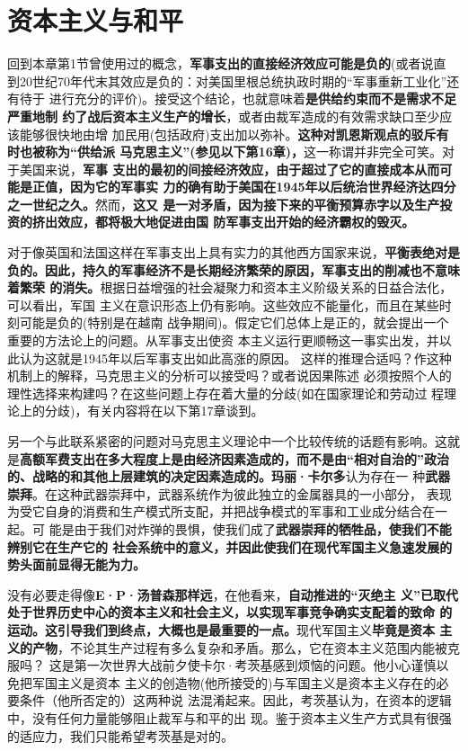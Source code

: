\section{资本主义与和平}
回到本章第1节曾使用过的概念，\textbf{军事支出的直接经济效应可能是负的}(或者说直
到20世纪70年代末其效应是负的：对美国里根总统执政时期的“军事重新工业化”还有待于
进行充分的评价)。接受这个结论，也就意味着\textbf{是供给约束而不是需求不足严重地制
  约了战后资本主义生产的增长}，或者由裁军造成的有效需求缺口至少应该能够很快地由增
加民用(包括政府)支出加以弥补。\textbf{这种对凯恩斯观点的驳斥有时也被称为“供给派
  马克思主义”(参见以下第16章)，}这一称谓并非完全可笑。对于美国来说，\textbf{军事
  支出的最初的间接经济效应，由于超过了它的直接成本从而可能是正值，因为它的军事实
  力的确有助于美国在1945年以后统治世界经济达四分之一世纪之久。}然而，\textbf{这又
  是一对矛盾，因为接下来的平衡预算赤字以及生产投资的挤出效应，都将极大地促进由国
  防军事支出开始的经济霸权的毁灭。}

对于像英国和法国这样在军事支出上具有实力的其他西方国家来说，\textbf{平衡表绝对是
  负的。因此，持久的军事经济不是长期经济繁荣的原因，军事支出的削减也不意味着繁荣
  的消失。}根据日益增强的社会凝聚力和资本主义阶级关系的日益合法化，可以看出，军国
主义在意识形态上仍有影响。这些效应不能量化，而且在某些时刻可能是负的(特别是在越南
战争期间)。假定它们总体上是正的，就会提出一个重要的方法论上的问题。从军事支出使资
本主义运行更顺畅这一事实出发，并以此认为这就是1945年以后军事支出如此高涨的原因。
这样的推理合适吗？作这种机制上的解释，马克思主义的分析可以接受吗？或者说因果陈述
必须按照个人的理性选择来构建吗？在这些问题上存在着大量的分歧(如在国家理论和劳动过
程理论上的分歧)，有关内容将在以下第17章谈到。

另一个与此联系紧密的问题对马克思主义理论中一个比较传统的话题有影响。这就
是\textbf{高额军费支出在多大程度上是由经济因素造成的，而不是由“相对自治的”政治
  的、战略的和其他上层建筑的决定因素造成的。}\textbf{玛丽·卡尔多}认为存在一
种\textbf{武器崇拜}。在这种武器崇拜中，武器系统作为彼此独立的金属器具的一小部分，
表现为受它自身的消费和生产模式所支配，并把战争模式的军事和工业成分结合在一起。可
能是由于我们对炸弹的畏惧，使我们成了\textbf{武器崇拜的牺牲品，使我们不能辨别它在生产它的
社会系统中的意义，并因此使我们在现代军国主义急速发展的势头面前显得无能为力。}

没有必要走得像\textbf{E·P·汤普森那样远}，在他看来，\textbf{自动推进的“灭绝主
  义”已取代处于世界历史中心的资本主义和社会主义，以实现军事竞争确实支配着的致命
  的运动。这引导我们到终点，大概也是最重要的一点。}现代军国主义\textbf{毕竟是资本
  主义的产物}，不论其生产过程有多么复杂和矛盾。那么，它在资本主义范围内能被克服吗？
这是第一次世界大战前夕使卡尔·考茨基感到烦恼的问题。他小心谨慎以免把军国主义是资本
主义的创造物(他所接受的)与军国主义是资本主义存在的必要条件（他所否定的）这两种说
法混淆起来。因此，考茨基认为，在资本的逻辑中，没有任何力量能够阻止裁军与和平的出
现。鉴于资本主义生产方式具有很强的适应力，我们只能希望考茨基是对的。






